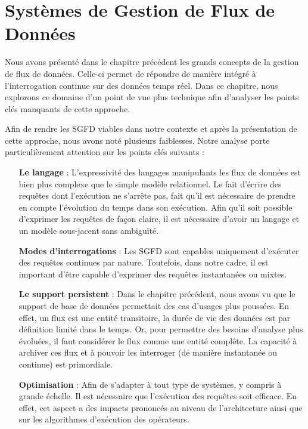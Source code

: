 
\chapter{Systèmes de Gestion de Flux de Données}\label{chap:rw:sgfd}
\chaptertoc
Nous avons présenté dans le chapitre précédent les grands concepts de la gestion de flux de données. Celle-ci permet de répondre de manière intégré à l'interrogation continue sur des données temps réel. Dans ce chapitre, nous explorons ce domaine d'un point de vue plus technique afin d'analyser les points clés manquants de cette approche.

Afin de rendre les SGFD viables dans notre contexte et après la présentation de cette approche, nous avons noté plusieurs faiblesses. Notre analyse porte particulièrement attention sur les points clés suivants : 
\begin{itemize}
	\item[\textbf{Le langage}] : L'expressivité des langages manipulants les flux de données est bien plus complexe que le simple modèle relationnel. Le fait d'écrire des requêtes dont l'exécution ne s'arrête pas, fait qu'il est nécessaire de prendre en compte l'évolution du temps dans son exécution. Afin qu'il soit possible d'exprimer les requêtes de façon claire, il est nécessaire d'avoir un langage et un modèle sous-jacent sans ambiguïté.
	\item[\textbf{Modes d'interrogations}] : Les SGFD sont capables uniquement d'exécuter des requêtes continues par nature. Toutefois, dans notre cadre, il est important d'être capable d'exprimer des requêtes instantanées ou mixtes. 
	\item[\textbf{Le support persistent}] : Dans le chapitre précédent, nous avons vu que le support de base de données permettait des cas d'usages plus poussées. En effet, un flux est une entité transitoire, la durée de vie des données est par définition limité dans le temps. Or, pour permettre des besoins d'analyse plus évoluées, il faut considérer le flux comme une entité complête. La capacité à archiver ces flux et à pouvoir les interroger (de manière instantanée ou continue) est primordiale.
	\item[\textbf{Optimisation}] : Afin de s'adapter à tout type de systèmes, y compris à grande échelle. Il est nécessaire que l'exécution des requêtes soit efficace. En effet, cet aspect a des impacts prononcés au niveau de l'architecture ainsi que sur les algorithmes d'exécution des opérateurs.
\end{itemize}

